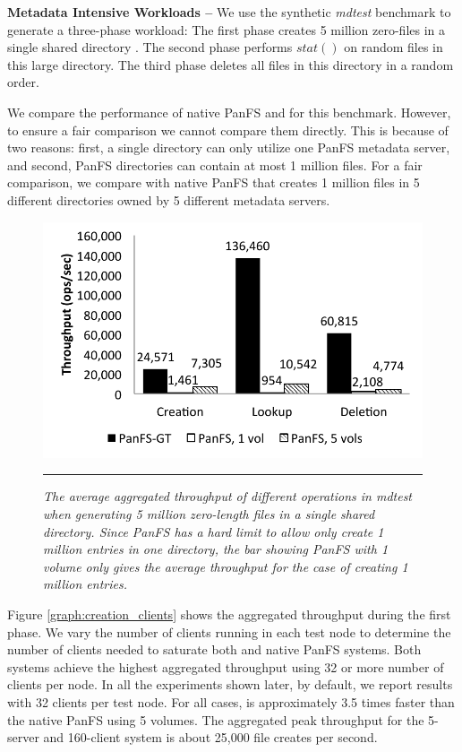 \textbf{Metadata Intensive Workloads -- }
We use the synthetic {\it mdtest} benchmark to generate a three-phase workload:
The first phase creates 5 million
zero-files in a single shared directory \cite{ceph:weil06, GIGA11}.
The second phase performs $stat()$ on random files in this large directory.
The third phase deletes all files in this directory in a random order.

We compare the performance of native PanFS and \psys for this benchmark.
However, to ensure a fair comparison we cannot compare them directly. This is
because of two reasons: first, a single directory can only utilize one PanFS 
metadata server, and second, PanFS directories can contain at most 1 million 
files.
For a fair comparison, we compare \psys with native PanFS that creates 1 million 
files in 5 different directories owned by 5 different metadata servers.

\begin{figure}[t]  %
\centerline{\includegraphics[scale=0.6]{./figs/mdtest}}
\vspace{10pt}
\caption{
\textit{
The average aggregated throughput of different operations in {\it mdtest}
when generating 5 million zero-length files in a single shared directory.
Since PanFS has a hard limit to allow only create 1 million entries
in one directory, the bar showing PanFS with 1 volume only gives
the average throughput for the case of creating 1 million entries.
}
}
\hrule
\label{graph:mdtest_ops}
\end{figure}       %

Figure \ref{graph:creation_clients} shows the aggregated throughput during
the first phase. We vary the number of clients running in each test node
to determine the number of clients needed to saturate both \psys and native
PanFS systems.
Both systems achieve the highest aggregated throughput using 32 or more number 
of clients per node. In all the experiments shown later, by default, we report 
results with 32 clients per test node.
For all cases, \psys is approximately 3.5 times faster than the native PanFS
using 5 volumes. The aggregated peak throughput for the 5-server and
160-client system is about 25,000 file creates per second. 

